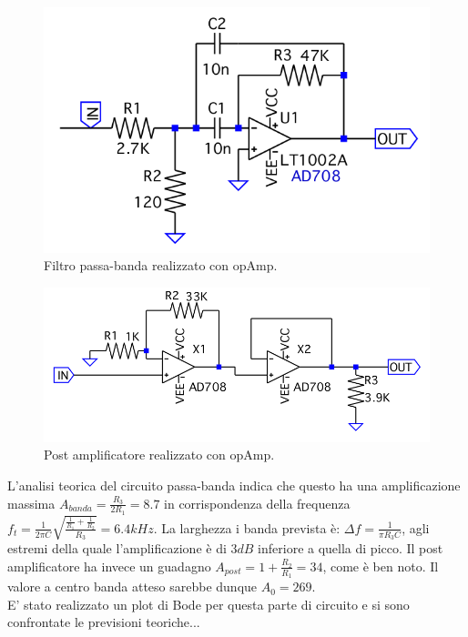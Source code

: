 \documentclass[10pt,a4paper]{article}
\begin{document}
\begin{figure}[!htb]
\centering
\includegraphics[scale=0.3]{banda.png}
\caption{Filtro passa-banda realizzato con opAmp.\label{banda}}
\end{figure}


\begin{figure}[!htb]
\centering
\includegraphics[scale=0.3]{postamp.png}
\caption{Post amplificatore realizzato con opAmp.\label{postamp}}
\end{figure}

L'analisi teorica del circuito passa-banda indica che questo ha una amplificazione massima $A_{banda} = \frac{R_3}{2 R_1} = 8.7$ in corrispondenza della frequenza $f_t = \frac{1}{2 \pi C} \sqrt{\frac{\frac{1}{R_1} + \frac{1}{R_2}}{R_3}} = 6.4 kHz$. La larghezza i banda prevista è: $\Delta f = \frac{1}{\pi R_3 C}$, agli estremi della quale l'amplificazione è di $3 dB$ inferiore a quella di picco. Il post amplificatore ha invece un guadagno $A_{post} = 1 + \frac{R_2}{R_1} = 34$, come è ben noto. Il valore a centro banda atteso sarebbe dunque $A_{0} = 269$.\\

E' stato realizzato un plot di Bode per questa parte di circuito e si sono confrontate le previsioni teoriche...
\end{document}
